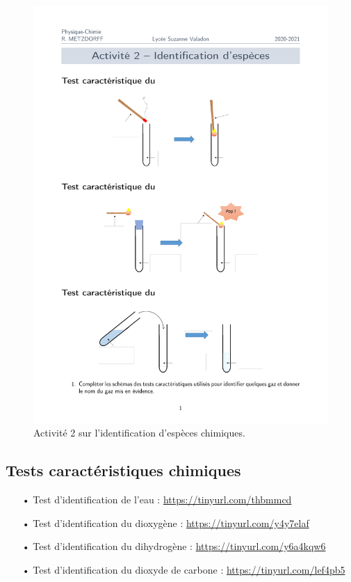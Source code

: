 \begin{figure}[h]
\includegraphics[page=2,scale=0.4]{chap1_act2.pdf}
\caption{Activité 2 sur l'identification d'espèces chimiques.}
\end{figure}

\subsection{Tests caractéristiques chimiques}

\begin{itemize}
\item[•] Test d'identification de l'eau : \href{https://tinyurl.com/thbmmcd}{https://tinyurl.com/thbmmcd}
\item[•] Test d'identification du dioxygène : \href{https://tinyurl.com/y4y7elaf}{https://tinyurl.com/y4y7elaf}
\item[•] Test d'identification du dihydrogène : \href{https://tinyurl.com/y6a4kqw6}{https://tinyurl.com/y6a4kqw6}
\item[•] Test d'identification du dioxyde de carbone : \href{https://tinyurl.com/lef4pb5}{https://tinyurl.com/lef4pb5}
\end{itemize}

